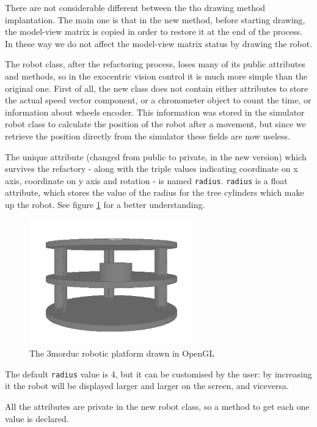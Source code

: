 %
There are not considerable different between the tho 
drawing method implantation. The main one is that in the 
new method, before starting drawing, the model-view matrix 
is copied in order to restore it at the end of the process. 
In these way we do not affect the model-view matrix status 
by drawing the robot.
%

%
The robot class, after the refactoring process, loses many 
of its public attributes and methods, so in the
exocentric vision control it is much more simple than the 
original one. First of all, the new class does not contain either
attributes to store the actual speed vector component, or 
a chronometer object to count the time, or information about wheels
encoder. This information was stored in the simulator robot 
class to calculate the position of the robot after a movement,
but since we retrieve the position directly from the simulator 
these fields are now useless. 
%

%
The unique attribute (changed from public to private, in 
the new version) which survives the refactory - along with the
triple values indicating coordinate on x axis, coordinate on 
y axis and rotation - is named \texttt{radius}. \texttt{radius}
is a float attribute, which stores the value of the radius for the 
tree cylinders which make up the robot. See figure
\ref{fig:3morduc_opengl} for a better understanding.
%
\begin{figure}[!h]
  \begin{center}
    \includegraphics[width=200pt]{img/3morduc_opengl.png}  %
    \caption{The 3morduc robotic platform drawn in OpenGL}
    \label{fig:3morduc_opengl}
  \end{center}
\end{figure}
%
The default \texttt{radius} value is 4, but it can be 
customised by the user: by increasing it the robot will be 
displayed larger and larger on the screen, and viceversa.
%

%
All the attributes are private in the new robot class, 
so a method to get each one value is declared. 
%

